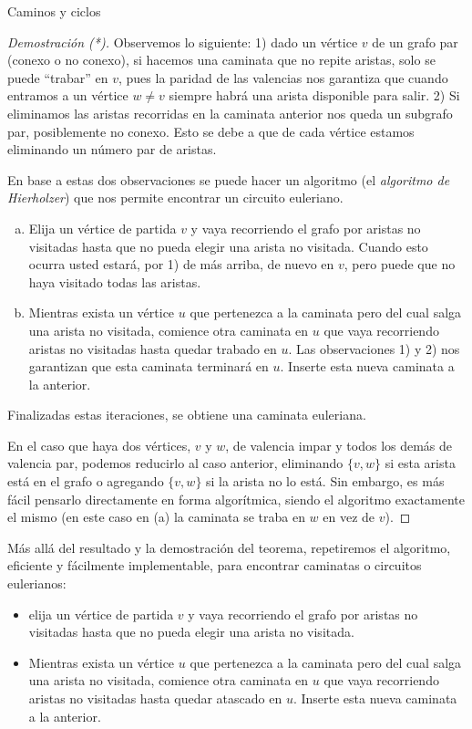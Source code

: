 \documentclass[11pt,spanish,makeidx]{amsbook}
\theoremstyle{definition}
\theoremstyle{remark}
\begin{document}
\begin{section}{Caminos y ciclos}
\begin{proof}[Demostración (*)]
	Observemos lo siguiente: 1) dado un vértice $v$ de un grafo par (conexo o no conexo), si hacemos una caminata que no repite aristas, solo se puede ``trabar'' en $v$, pues la paridad de las valencias nos garantiza que cuando entramos a un vértice $w \not= v$ siempre habrá una arista disponible para salir. 2) Si eliminamos las aristas recorridas en la caminata anterior nos queda un subgrafo par, posiblemente no conexo. Esto se debe a que de cada vértice estamos eliminando un número par de aristas. 
	
	En  base a estas dos observaciones se puede hacer un algoritmo (el \textit{algoritmo de  Hierholzer}) que nos permite encontrar un circuito euleriano.
	\begin{enumerate}[(a)]
		\item Elija un vértice de partida $v$ y vaya recorriendo el grafo por aristas no visitadas hasta que no pueda elegir una arista no visitada. Cuando esto ocurra usted estará, por 1)  de más arriba, de nuevo en $v$, pero puede que no haya visitado todas las aristas. 
		\item Mientras exista un vértice $u$ que pertenezca a la caminata pero del cual salga una arista no visitada, comience otra caminata en $u$ que vaya recorriendo aristas no visitadas hasta quedar trabado en $u$. Las observaciones 1) y 2) nos garantizan que esta caminata terminará en $u$. Inserte esta nueva caminata a la anterior. 
	\end{enumerate} 
	Finalizadas estas iteraciones, se obtiene una caminata euleriana. 
	
	En  el caso que haya dos vértices, $v$ y $w$, de valencia impar y todos los demás de valencia par, podemos reducirlo al caso anterior, eliminando   $\{v,w\}$ si esta arista está en el grafo o  agregando  $\{v,w\}$ si la arista no lo está. Sin embargo, es más fácil pensarlo directamente en forma algorítmica, siendo el algoritmo exactamente el mismo (en este caso en (a) la caminata se traba en $w$ en vez de $v$).   
\end{proof}


Más allá del resultado y la demostración del teorema, repetiremos el algoritmo, eficiente y fácilmente implementable,  para encontrar caminatas o circuitos eulerianos:
\begin{itemize}
	\item elija un vértice de partida $v$ y vaya recorriendo el grafo por aristas no visitadas hasta que no pueda elegir una arista no visitada. 
	\item Mientras exista un vértice $u$ que pertenezca a la caminata pero del cual salga una arista no visitada, comience otra caminata en $u$ que vaya recorriendo aristas no visitadas hasta quedar atascado en $u$. Inserte esta nueva caminata a la anterior. 
\end{itemize}



\end{section}
\end{document}
